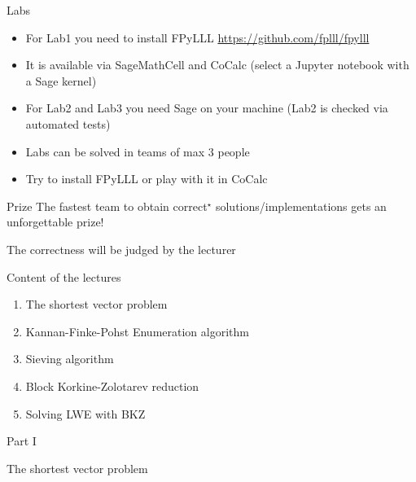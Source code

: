 \documentclass[usenames,dvipsnames, 9pt, aspectratio=169]{beamer}
\begin{document}
\begin{frame}{Labs}
\LARGE 
\begin{itemize}
	\itemsep 8pt
	\item For Lab1 you need to install FPyLLL \url{https://github.com/fplll/fpylll}
	\item It is available via SageMathCell and CoCalc (select a Jupyter notebook with a Sage kernel)
	\item For Lab2 and Lab3 you need Sage on your machine (Lab2 is checked via automated tests)
	\item Labs can be solved in teams of {\color{Orange} max 3} people
	\item Try to install FPyLLL or play with it in CoCalc
\end{itemize}
\end{frame}

\begin{frame}{Prize}
\Huge 
\centering
The fastest team to obtain correct$^\star$ solutions/implementations gets an unforgettable prize!

\vfill
\Large  The correctness will be judged by the lecturer
\end{frame}


\begin{frame}{Content of the lectures}
\LARGE
\begin{enumerate}
	\setlength\itemsep{10pt}
	\item The shortest vector problem
	\item Kannan-Finke-Pohst Enumeration algorithm
	\item Sieving algorithm \\[5pt]
	\item Block Korkine-Zolotarev reduction
	\item Solving LWE with BKZ
	
\end{enumerate}

\end{frame}

\begin{frame}
Part I \\ [10pt]
\centering
\begin{LARGE}
	
	
	\color{Orange}
	\Huge The shortest vector problem
	
\end{LARGE}
\end{frame}
\end{document}
